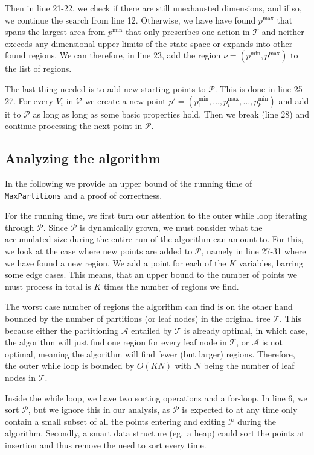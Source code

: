 Then in line 21-22, we check if there are still unexhausted dimensions, and if
so, we continue the search from line 12. Otherwise, we have have found
$p^{\max}$ that spans the largest area from $p^{\min}$ that only prescribes one
action in $\mathcal{T}$ and neither exceeds any dimensional upper limits of the
state space or expands into other found regions. We can therefore, in line 23,
add the region $\nu = (p^{\min},p^{\max})$ to the list of regions.

The last thing needed is to add new starting points to $\mathcal{P}$. This is
done in line 25-27. For every $V_i$ in $\mathcal{V}$ we create a new point $p' =
(p^{\min}_1, \ldots, p^{\max}_i, \ldots, p^{\min}_k)$ and add it to
$\mathcal{P}$ as long as long as some basic properties hold. Then we break (line
28) and continue processing the next point in $\mathcal{P}$.


\subsection{Analyzing the algorithm}%
\label{sub:maxPartsAnalysis}

In the following we provide an upper bound of the running time of
\texttt{MaxPartitions} and a proof of correctness.

For the running time, we first turn our attention to the outer while loop
iterating through $\mathcal{P}$. Since $\mathcal{P}$ is dynamically grown, we
must consider what the accumulated size during the entire run of the algorithm
can amount to. For this, we look at the case where new points are added to
$\mathcal{P}$, namely in line 27-31 where we have found a new region. We add a
point for each of the $K$ variables, barring some edge cases. This means, that
an upper bound to the number of points we must process in total is $K$ times the
number of regions we find.

The worst case number of regions the algorithm can find is on the other hand
bounded by the number of partitions (or leaf nodes) in the original tree
$\mathcal{T}$. This because either the partitioning $\mathcal{A}$ entailed by
$\mathcal{T}$ is already optimal, in which case, the algorithm will just find
one region for every leaf node in $\mathcal{T}$, or $\mathcal{A}$ is not
optimal, meaning the algorithm will find fewer (but larger) regions. Therefore,
the outer while loop is bounded by $O(KN)$ with $N$ being the number of leaf
nodes in $\mathcal{T}$.

Inside the while loop, we have two sorting operations and a for-loop. In line 6,
we sort $\mathcal{P}$, but we ignore this in our analysis, as $\mathcal{P}$ is
expected to at any time only contain a small subset of all the points entering
and exiting $\mathcal{P}$ during the algorithm. Secondly, a smart data structure
(eg.\ a heap) could sort the points at insertion and thus remove the need to
sort every time.

